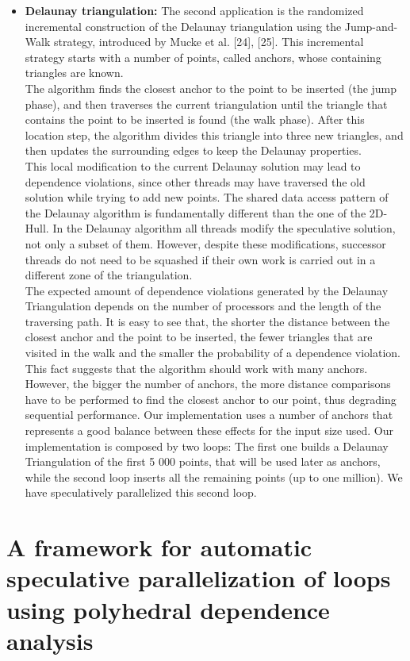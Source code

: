 \documentclass[10pt]{report}          %
\begin{document}
\begin{itemize}
\item \textbf{Delaunay triangulation:} The second application is the randomized incremental construction of the Delaunay triangulation using the Jump-and-Walk strategy, introduced by Mucke et al. [24], [25]. This incremental strategy starts with a number of points, called anchors, whose containing triangles are known. \\
The algorithm ﬁnds the closest anchor to the point to be inserted (the jump phase), and then traverses the current triangulation until the triangle that contains the point to
be inserted is found (the walk phase). After this location step, the algorithm divides this triangle into three new triangles, and then updates the surrounding edges to
keep the Delaunay properties.\\
This local modiﬁcation to the current Delaunay solution may lead to dependence
violations, since other threads may have traversed the old solution while trying to add new points. The shared data access pattern of the Delaunay algorithm is fundamentally different than the one of the 2D-Hull. In the Delaunay algorithm all threads modify the
speculative solution, not only a subset of them. However, despite these modiﬁcations, successor threads do not need to be squashed if their own work is carried out
in a different zone of the triangulation.\\
The expected amount of dependence violations generated by the Delaunay Triangulation depends on the number of processors and the length of the traversing path. It is easy to see that, the shorter the distance between the closest anchor and the point to be inserted, the fewer triangles that are visited in the walk and the smaller the probability of a dependence violation. This fact suggests that the algorithm should work with many anchors. However, the bigger the number of anchors, the more distance comparisons have to be performed to ﬁnd the closest anchor to our point, thus degrading sequential performance. Our implementation uses a number of anchors that represents a good balance between these effects for the input size used. Our implementation is
composed by two loops: The ﬁrst one builds a Delaunay Triangulation of the ﬁrst 5 000 points, that will be used later as anchors, while the second loop inserts all the
remaining points (up to one million). We have speculatively parallelized this second loop.
\end{itemize}

\chapter{A framework for automatic speculative parallelization of loops using polyhedral dependence analysis}
\label{chapter:polly}
\end{document}
